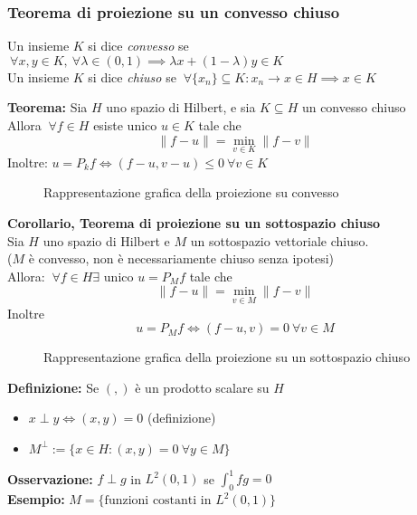 \subsubsection{Teorema di proiezione su un convesso chiuso}
Un insieme $K$ si dice \emph{convesso} se $\ \forall x,y\in K,\ \forall \lambda\in (0,1)\implies \lambda x +(1-\lambda)y\in K$
\\Un insieme $K$ si dice \emph{chiuso} se $\ \forall \{x_n\} \subseteq  K:x_n\to x\in H\implies x\in K$
\begin{tcolorbox}
\textbf{Teorema: }Sia $H$ uno spazio di Hilbert, e sia $K\subseteq  H$ un convesso chiuso
\\Allora $\ \forall f\in H$ esiste unico $u\in K$ tale che
\[\|f-u\|=\min_{v\in K}\|f-v\|\]
Inoltre: $u=P_kf\iff (f-u,v-u)\le 0 \ \forall v\in K$
\end{tcolorbox}
\begin{figure}[ht]
    \centering
    \caption{Rappresentazione grafica della proiezione su convesso}
    \label{fig:convesso}
\end{figure}
\begin{tcolorbox}
\textbf{Corollario, Teorema di proiezione su un sottospazio chiuso}
\\Sia $H$ uno spazio di Hilbert e $M$ un sottospazio vettoriale chiuso.
\\($M$ è convesso, non è necessariamente chiuso senza ipotesi)
\\Allora: $\ \forall f\in H\exists \text{ unico }u=P_Mf$ tale che
\[\|f-u\|=\min_{v\in M}\|f-v\|\]
Inoltre 
\[u=P_Mf  \iff (f-u,v)=0\ \forall v\in M\]
\end{tcolorbox}
\begin{figure}[ht]
    \centering
    \caption{Rappresentazione grafica della proiezione su un sottospazio chiuso}
    \label{fig:sottchiuso}
\end{figure}
\begin{tcolorbox}
	\textbf{Definizione: }Se $(,)$ è un prodotto scalare su $H$ 
	\begin{itemize}
		\item $x\perp y \iff (x,y)=0$ (definizione)
		\item $M^{\perp}:=\{x\in H:(x,y)=0 \ \forall y\in M\} $
	\end{itemize}
\end{tcolorbox}
\textbf{Osservazione: }$f\perp g$ in $L^{2}(0,1)$ se $\int_{0}^{1} fg=0 $ 
\\\textbf{Esempio:} $M=\{\text{funzioni costanti in }L^{2}(0,1)\} $
